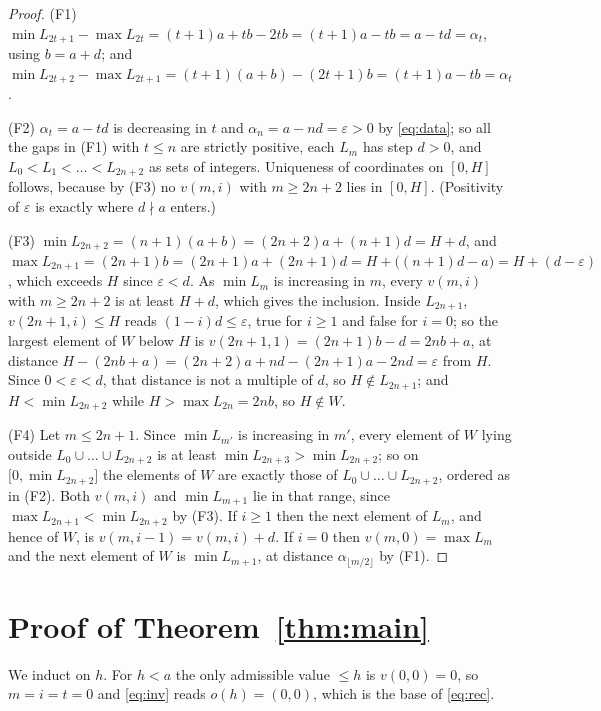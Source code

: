 \documentclass[11pt]{amsart}
\theoremstyle{definition}
\theoremstyle{remark}
\begin{document}
\begin{proof}
(F1) $\min L_{2t+1}-\max L_{2t}=(t+1)a+tb-2tb=(t+1)a-tb=a-td=\alpha_t$, using
$b=a+d$; and
$\min L_{2t+2}-\max L_{2t+1}=(t+1)(a+b)-(2t+1)b=(t+1)a-tb=\alpha_t$.

(F2) $\alpha_t=a-td$ is decreasing in $t$ and $\alpha_n=a-nd=\varepsilon>0$ by
\eqref{eq:data}; so all the gaps in (F1) with $t\le n$ are strictly positive,
each $L_m$ has step $d>0$, and $L_0<L_1<\dots<L_{2n+2}$ as sets of integers.
Uniqueness of coordinates on $[0,H]$ follows, because by (F3) no
$v(m,i)$ with $m\ge2n+2$ lies in $[0,H]$. (Positivity of $\varepsilon$ is
exactly where $d\nmid a$ enters.)

(F3) $\min L_{2n+2}=(n+1)(a+b)=(2n+2)a+(n+1)d=H+d$, and
$\max L_{2n+1}=(2n+1)b=(2n+1)a+(2n+1)d=H+\bigl((n+1)d-a\bigr)=H+(d-\varepsilon)$,
which exceeds $H$ since $\varepsilon<d$. As $\min L_m$ is increasing in $m$,
every $v(m,i)$ with $m\ge2n+2$ is at least $H+d$, which gives the inclusion.
Inside $L_{2n+1}$, $v(2n+1,i)\le H$ reads $(1-i)d\le\varepsilon$, true for
$i\ge1$ and false for $i=0$; so the largest element of $W$ below $H$ is
$v(2n+1,1)=(2n+1)b-d=2nb+a$, at distance
$H-(2nb+a)=(2n+2)a+nd-(2n+1)a-2nd=\varepsilon$ from $H$. Since
$0<\varepsilon<d$, that distance is not a multiple of $d$, so $H\notin L_{2n+1}$;
and $H<\min L_{2n+2}$ while $H>\max L_{2n}=2nb$, so $H\notin W$.

(F4) Let $m\le2n+1$. Since $\min L_{m'}$ is increasing in $m'$, every element of
$W$ lying outside $L_0\cup\dots\cup L_{2n+2}$ is at least
$\min L_{2n+3}>\min L_{2n+2}$; so on $\bigl[0,\min L_{2n+2}\bigr]$ the elements
of $W$ are exactly those of $L_0\cup\dots\cup L_{2n+2}$, ordered as in (F2).
Both $v(m,i)$ and $\min L_{m+1}$ lie in that range, since
$\max L_{2n+1}<\min L_{2n+2}$ by (F3). If $i\ge1$ then the next element of
$L_m$, and hence of $W$, is $v(m,i-1)=v(m,i)+d$. If $i=0$ then
$v(m,0)=\max L_m$ and the next element of $W$ is $\min L_{m+1}$, at distance
$\alpha_{\lfloor m/2\rfloor}$ by (F1).
\end{proof}

\section{Proof of Theorem~\ref{thm:main}}

We induct on $h$. For $h<a$ the only admissible value $\le h$ is $v(0,0)=0$, so
$m=i=t=0$ and \eqref{eq:inv} reads $o(h)=(0,0)$, which is the base of
\eqref{eq:rec}.
\end{document}
